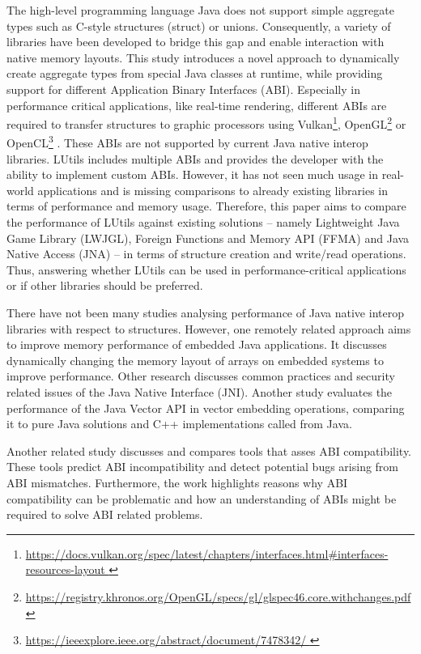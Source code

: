 The high-level programming language Java does not support simple aggregate types such as C-style structures (struct) or unions\cite{b1}.
Consequently, a variety of libraries have been developed to bridge this gap and enable interaction with native memory layouts\cite{b2}.
This study introduces a novel approach to dynamically create aggregate types from special Java classes at runtime, while
providing support for different Application Binary Interfaces (ABI).
Especially in performance critical applications, like real-time rendering, different ABIs are required to transfer structures
to graphic processors using Vulkan\footnote{
    \url{
        https://docs.vulkan.org/spec/latest/chapters/interfaces.html#interfaces-resources-layout
    }
}, OpenGL\footnote{
    \url{
        https://registry.khronos.org/OpenGL/specs/gl/glspec46.core.withchanges.pdf
    }
} or OpenCL\footnote{
    \url{
        https://ieeexplore.ieee.org/abstract/document/7478342/
    }
}
\@.
These ABIs are not supported by current Java native interop libraries.
LUtils includes multiple ABIs and provides the developer with the ability to implement custom ABIs. However, it has not
seen much usage in real-world applications and is missing comparisons to already existing libraries in terms of performance and
memory usage.
Therefore, this paper aims to compare the performance of LUtils against existing solutions – namely Lightweight Java Game
Library (LWJGL), Foreign Functions and Memory API (FFMA) and Java Native Access (JNA) – in
terms of structure creation and write/read operations.
Thus, answering whether LUtils can be used in performance-critical applications or if other libraries should be preferred.

There have not been many studies analysing performance of Java native interop libraries with respect to structures.
However, one remotely related approach\cite{b3} aims to improve memory performance of embedded Java applications.
It discusses dynamically changing the memory layout of arrays on embedded systems to improve performance.
Other research\cite{b4,b5,b6} discusses common practices and security related issues of the Java Native Interface (JNI).
Another study\cite{b7} evaluates the performance of the Java Vector API in vector embedding operations, comparing it to pure
Java solutions and C++ implementations called from Java.

Another related study\cite{b8} discusses and compares tools that asses ABI compatibility.
These tools predict ABI incompatibility and detect potential bugs arising from ABI mismatches.
Furthermore, the work highlights reasons why ABI compatibility can be problematic and how an understanding of ABIs might
be required to solve ABI related problems.

